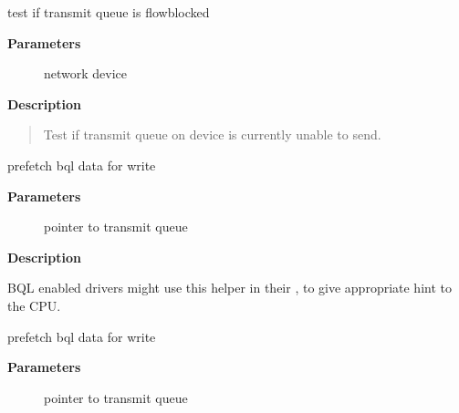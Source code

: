 \documentclass[a4paper,8pt,english]{sphinxmanual}
\begin{document}
\begin{fulllineitems}
\label{networking/kapi:c.netif_queue_stopped}
test if transmit queue is flowblocked

\end{fulllineitems}


\textbf{Parameters}
\begin{description}
\item[{}] \leavevmode
network device

\end{description}

\textbf{Description}
\begin{quote}

Test if transmit queue on device is currently unable to send.
\end{quote}

\begin{fulllineitems}
\label{networking/kapi:c.netdev_txq_bql_enqueue_prefetchw}
prefetch bql data for write

\end{fulllineitems}


\textbf{Parameters}
\begin{description}
\item[{}] \leavevmode
pointer to transmit queue

\end{description}

\textbf{Description}

BQL enabled drivers might use this helper in their ,
to give appropriate hint to the CPU.

\begin{fulllineitems}
\label{networking/kapi:c.netdev_txq_bql_complete_prefetchw}
prefetch bql data for write

\end{fulllineitems}


\textbf{Parameters}
\begin{description}
\item[{}] \leavevmode
pointer to transmit queue

\end{description}
\end{document}
